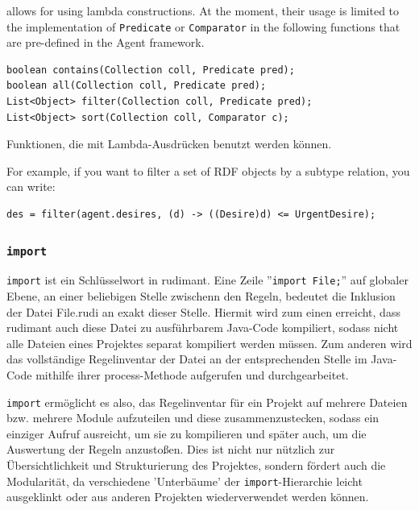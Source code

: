 \vonda allows for using lambda constructions. At the moment, their usage is limited to the implementation of \texttt{Predicate} or \texttt{Comparator} in the following functions that are pre-defined in the Agent framework.

\begin{table}[htbp]
  \centering
  \begin{small}
\begin{verbatim}
boolean contains(Collection coll, Predicate pred);
boolean all(Collection coll, Predicate pred);
List<Object> filter(Collection coll, Predicate pred);
List<Object> sort(Collection coll, Comparator c);
\end{verbatim}
  \end{small}

  \caption{Funktionen, die mit Lambda-Ausdrücken benutzt werden können.}
  \label{tab:lambda-functions}
\end{table}

For example, if you want to filter a set of RDF objects by a subtype relation, you can write:

\begin{verbatim}
des = filter(agent.desires, (d) -> ((Desire)d) <= UrgentDesire);
\end{verbatim}

\subsubsection{\texttt{import}}

\texttt{import} ist ein Schlüsselwort in rudimant. Eine Zeile ''\texttt{import
  File;}'' auf globaler Ebene, an einer beliebigen Stelle zwischenn den Regeln,
bedeutet die Inklusion der Datei File.rudi an exakt dieser Stelle. Hiermit wird
zum einen erreicht, dass rudimant auch diese Datei zu ausführbarem Java-Code
kompiliert, sodass nicht alle Dateien eines Projektes separat kompiliert werden
müssen. Zum anderen wird das vollständige Regelinventar der Datei an der
entsprechenden Stelle im Java-Code mithilfe ihrer process-Methode aufgerufen
und durchgearbeitet.

\texttt{import} ermöglicht es also, das Regelinventar für ein Projekt auf
mehrere Dateien bzw. mehrere Module aufzuteilen und diese zusammenzustecken,
sodass ein einziger Aufruf ausreicht, um sie zu kompilieren und später auch, um
die Auswertung der Regeln anzustoßen. Dies ist nicht nur nützlich zur
Übersichtlichkeit und Strukturierung des Projektes, sondern fördert auch die
Modularität, da verschiedene 'Unterbäume' der \texttt{import}-Hierarchie leicht
ausgeklinkt oder aus anderen Projekten wiederverwendet werden können.

